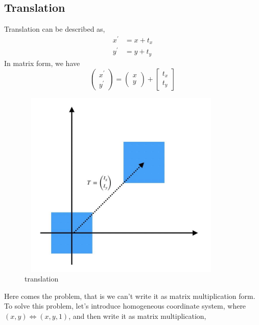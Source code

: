 \documentclass[12pt, a4 paper]{article}
\begin{document}
\subsection{Translation}
Translation can be described as,
\begin{align}
    x^{\prime} &= x + t_{x}\\
    y^{\prime} &= y + t_{y}
\end{align}
\indent In matrix form, we have
\begin{equation}
    \begin{pmatrix} x^{\prime} \\ y^{\prime} \end{pmatrix}=
    \begin{pmatrix} x \\ y \end{pmatrix} + 
    \begin{bmatrix} t_{x} \\ t_{y} \end{bmatrix}
\end{equation}
\begin{figure}[h]
    \centering
    \includegraphics[width=10cm,height=9cm]{translation.jpg}
    \caption{translation}
\end{figure}
\indent Here comes the problem, that is we can't write it as
matrix multiplication form. To solve this problem, let's 
introduce homogeneous coordinate system, where $(x, y )
\iff (x, y ,1)$, and then write it as matrix multiplication,
\end{document}
